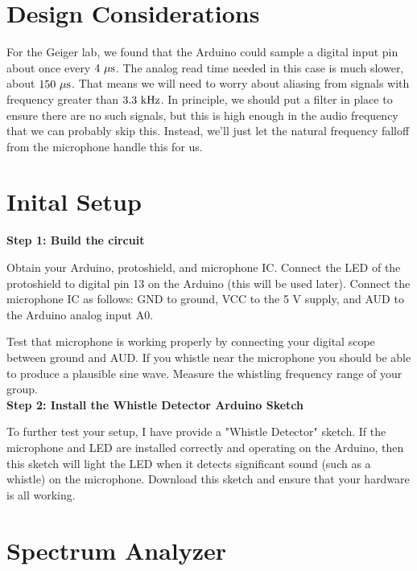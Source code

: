 \documentclass[12pt]{article}
\begin{document}
\section{Design Considerations}

For the Geiger lab, we found that the Arduino could sample a digital input pin about once every $4~{\rm \mu s}$.
The analog read time needed in this case is much slower, about $150~{\rm \mu s}$.  That means we will need to 
worry about aliasing from signals with frequency greater than $3.3~{\rm kHz}$.  In principle, we should put a filter in place to ensure there are no such signals, but this is high enough in the audio frequency that we can probably skip this.  Instead, we'll just let the natural frequency falloff from the microphone handle this for us.

\section{Inital Setup}

\noindent
{\bf Step 1:  Build the circuit} \\
\vspace{0.25cm}

\noindent
Obtain your Arduino, protoshield, and microphone IC.  Connect the LED of the
protoshield to digital pin 13 on the Arduino (this will be used later).  Connect
the microphone IC as follows: GND to ground, VCC to the 5 V
supply, and AUD to the Arduino analog input A0.  

Test that microphone is working properly by connecting your digital scope
between ground and AUD.  If you whistle near the microphone you should be able
to produce a plausible sine wave.  Measure the whistling frequency range of your
group. \\

\vspace{0.25cm}
\noindent
{\bf Step 2:  Install the Whistle Detector Arduino Sketch} \\
\vspace{0.25cm}

To further test your setup, I have provide a "Whistle Detector" sketch.  If the microphone and LED are installed correctly and operating on the Arduino, then this sketch will light the LED when it detects significant sound (such as a whistle) on the microphone.  Download this sketch and ensure that your hardware is all working.

\section{Spectrum Analyzer}
\end{document}
